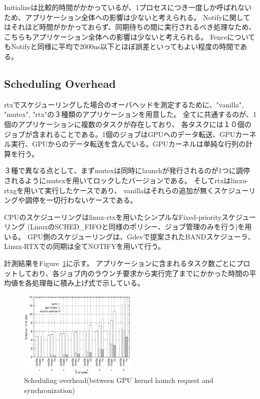 Initializeは比較的時間がかかっているが、1プロセスにつき一度しか呼ばれないため、アプリケーション全体への影響は少ないと考えられる。
Notifyに関してはそれほど時間がかかっておらず、同期待ちの間に実行されるべき処理なため、こちらもアプリケーション全体への影響は少ないと考えられる。
FenceについてもNotifyと同様に平均で2000ns以下とほぼ誤差といってもよい程度の時間である。

\subsection{Scheduling Overhead}\label{sec:eval:sched_overhead}

rtxでスケジューリングした場合のオーバヘッドを測定するために、"vanilla", "mutex", "rtx"の３種類のアプリケーションを用意した。
全てに共通するのが、1個のアプリケーションに複数のタスクが存在しており、
各タスクには１０個のジョブが含まれることである。1個のジョブはGPUへのデータ転送、GPUカーネル実行、GPUからのデータ転送を含んでいる。GPUカーネルは単純な行列の計算を行う。

３種で異なる点として、まずmutexは同時にlaunchが発行されるのが1つに調停されるようにmutexを用いてロックしたバージョンである。
そしてrtxはlinxu-rtxgを用いて実行したケースであり、
vanillaはそれらの追加が無くスケジューリングや調停を一切行わないケースである。

CPUのスケジューリングはlinux-rtxを用いたシンプルなFixed-priorityスケジューリング (LinuxのSCHED\_FIFOと同様のポリシー、ジョブ管理のみを行う)を用いる。
GPU側のスケジューリングは、Gdevで提案されたBANDスケジューラ、Linux-RTXでの同期は全てNOTIFYを用いて行う。

計測結果をFigure~\ref{fig:fp_overhead}に示す。
アプリケーションに含まれるタスク数ごとにプロットしており、各ジョブ内のラウンチ要求から実行完了までにかかった時間の平均値を各処理毎に積み上げ式で示している。


\begin{figure}[t]
\begin{center}
\includegraphics[width=0.5\textwidth]{img/sum_task_fp.eps}
\caption{Scheduling overhead(between GPU kernel launch request and synchronization)}
\end{center}
\label{fig:fp_overhead}
\end{figure}

